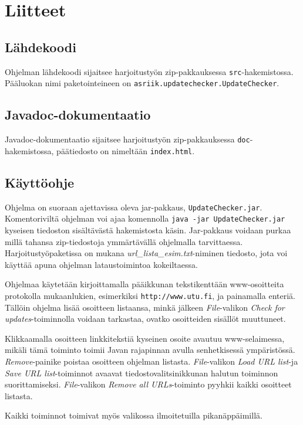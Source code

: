 \documentclass{itlaitos}
\begin{document}
\newpage
\section{Liitteet}
\subsection{Lähdekoodi}
Ohjelman läh\-de\-koo\-di sijaitsee har\-joi\-tus\-työn zip-\-pak\-kauk\-ses\-sa \texttt{src}-ha\-ke\-mis\-tos\-sa. Pää\-luo\-kan nimi pa\-ke\-toin\-tei\-neen on \texttt{asriik.updatechecker.UpdateChecker}.

\subsection{Javadoc-dokumentaatio}
Javadoc-dokumentaatio sijaitsee harjoitustyön zip-pakkauksessa \texttt{doc}-hakemistossa, päätiedosto on nimeltään \texttt{index.html}.

\subsection{Käyttöohje}
Ohjelma on suoraan ajettavissa oleva jar-pakkaus, \texttt{UpdateChecker.jar}. Komentoriviltä ohjelman voi ajaa komennolla \texttt{java -jar UpdateChecker.jar} kyseisen tiedoston sisältävästä hakemistosta käsin. Jar-pakkaus voidaan purkaa millä tahansa zip-tiedostoja ymmärtävällä ohjelmalla tarvittaessa. Harjoitustyöpaketissa on mukana \emph{url\_lista\_esim.txt}-niminen tiedosto, jota voi käyttää apuna ohjelman lataustoimintoa kokeiltaessa.

Ohjelmaa käytetään kirjoittamalla pääikkunan tekstikenttään www-osoitteita protokolla mukaanlukien, esimerkiksi \texttt{http://www.utu.fi}, ja painamalla enteriä. Tällöin ohjelma lisää osoitteen listaansa, minkä jälkeen \emph{File}-valikon \emph{Check for updates}-toiminnolla voidaan tarkastaa, ovatko osoitteiden sisällöt muuttuneet.

Klikkaamalla osoitteen linkkitekstiä kyseinen osoite avautuu www-selaimessa, mikäli tämä toiminto toimii Javan rajapinnan avulla senhetkisessä ympäristössä. \emph{Remove}-painike poistaa osoitteen ohjelman listasta.  \emph{File}-valikon \emph{Load URL list}-ja \emph{Save URL list}-toiminnot avaavat tiedostovalitsinikkunan halutun toiminnon suorittamiseksi. \emph{File}-valikon \emph{Remove all URLs}-toiminto pyyhkii kaikki osoitteet listasta.

Kaikki toiminnot toimivat myös valikossa ilmoitetuilla pikanäppäimillä.



\cleardoublepage %
\end{document}
